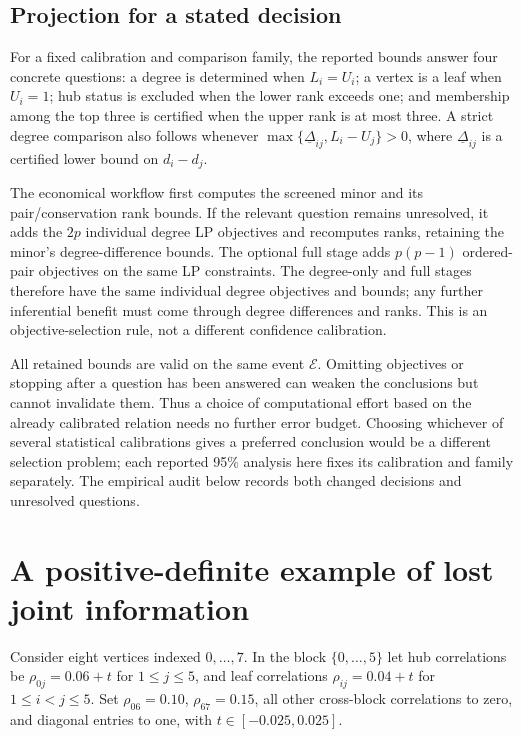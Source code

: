 \documentclass[11pt]{article}
\theoremstyle{plain}
\theoremstyle{definition}\newtheorem{remark}{Remark}\newtheorem{example}{Example}
\begin{document}
\subsection{Projection for a stated decision}\label{sec:decision-workflow}
For a fixed calibration and comparison family, the reported bounds answer four concrete questions: a degree is determined when $L_i=U_i$; a vertex is a leaf when $U_i=1$; hub status is excluded when the lower rank exceeds one; and membership among the top three is certified when the upper rank is at most three. A strict degree comparison also follows whenever $\max\{\underline\Delta_{ij},L_i-U_j\}>0$, where $\underline\Delta_{ij}$ is a certified lower bound on $d_i-d_j$.

The economical workflow first computes the screened minor and its pair/conservation rank bounds. If the relevant question remains unresolved, it adds the $2p$ individual degree LP objectives and recomputes ranks, retaining the minor's degree-difference bounds. The optional full stage adds $p(p-1)$ ordered-pair objectives on the same LP constraints. The degree-only and full stages therefore have the same individual degree objectives and bounds; any further inferential benefit must come through degree differences and ranks. This is an objective-selection rule, not a different confidence calibration.

All retained bounds are valid on the same event $\mathcal E$. Omitting objectives or stopping after a question has been answered can weaken the conclusions but cannot invalidate them. Thus a choice of computational effort based on the already calibrated relation needs no further error budget. Choosing whichever of several statistical calibrations gives a preferred conclusion would be a different selection problem; each reported 95\% analysis here fixes its calibration and family separately. The empirical audit below records both changed decisions and unresolved questions.

\section{A positive-definite example of lost joint information}\label{sec:example}
Consider eight vertices indexed $0,\ldots,7$. In the block $\{0,\ldots,5\}$ let hub correlations be $\rho_{0j}=0.06+t$ for $1\le j\le5$, and leaf correlations $\rho_{ij}=0.04+t$ for $1\le i<j\le5$. Set $\rho_{06}=0.10$, $\rho_{67}=0.15$, all other cross-block correlations to zero, and diagonal entries to one, with $t\in[-0.025,0.025]$.
\end{document}
